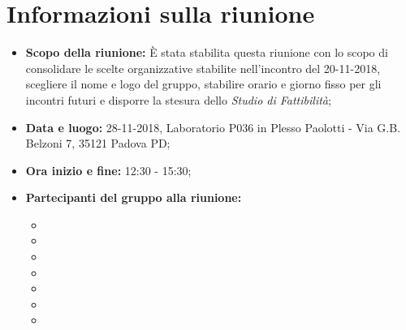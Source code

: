 \clearpage
\section{Informazioni sulla riunione}
\begin{itemize}
	\item \textbf {Scopo della riunione:} È stata stabilita questa riunione con lo scopo di consolidare le scelte organizzative stabilite nell'incontro del 20-11-2018, scegliere il nome e logo del gruppo, stabilire orario e giorno fisso per gli incontri futuri e disporre la stesura dello \emph{Studio di Fattibilità};
	
	\item \textbf {Data e luogo:} 28-11-2018, Laboratorio P036 in Plesso Paolotti - Via G.B. Belzoni 7, 35121 Padova PD;
	
	\item \textbf {Ora inizio e fine:} 12:30 - 15:30;
	
	\item \textbf {Partecipanti del gruppo alla riunione:} 
		 \begin{itemize}
			\item \sonia
			\item \luca
			\item \matteo
			\item \pardeep
			\item \alberto
			\item \alessandro
			\item \andrea
		\end{itemize}
\end{itemize}